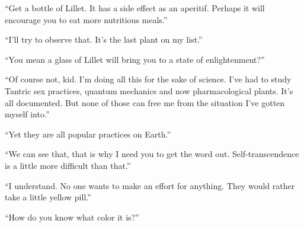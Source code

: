 ``Get a bottle of Lillet. It has a side effect as an aperitif. Perhaps it will encourage you to eat more nutritious meals.''

``I'll try to observe that. It's the last plant on my list.''

``You mean a glass of Lillet will bring you to a state of enlightenment?''

``Of course not, kid. I'm doing all this for the sake of science. I've had to study Tantric sex practices, quantum mechanics and now pharmacological plants. It's all documented. But none of those can free me from the situation I've gotten myself into.''

``Yet they are all popular practices on Earth.''

``We can see that, that is why I need you to get the word out. Self-transcendence is a little more difficult than that.''

``I understand. No one wants to make an effort for anything. They would rather take a little yellow pill.''

``How do you know what color it is?''



